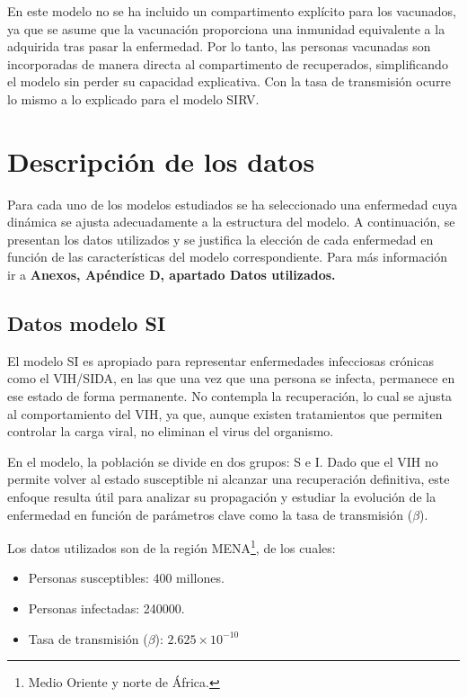 En este modelo no se ha incluido un compartimento explícito para los vacunados, ya que se asume que la vacunación proporciona una inmunidad equivalente a la adquirida tras pasar la enfermedad. Por lo tanto, las personas vacunadas son incorporadas de manera directa al compartimento de recuperados, simplificando el modelo sin perder su capacidad explicativa. Con la tasa de transmisión ocurre lo mismo a lo explicado para el modelo SIRV.




\section{Descripción de los datos}
Para cada uno de los modelos estudiados se ha seleccionado una enfermedad cuya dinámica se ajusta adecuadamente a la estructura del modelo. A continuación, se presentan los datos utilizados y se justifica la elección de cada enfermedad en función de las características del modelo correspondiente. Para más información ir a \textbf{Anexos, Apéndice D, apartado Datos utilizados.}

\subsection{Datos modelo SI}
El modelo SI es apropiado para representar enfermedades infecciosas crónicas como el VIH/SIDA, en las que una vez que una persona se infecta, permanece en ese estado de forma permanente. No contempla la recuperación, lo cual se ajusta al comportamiento del VIH, ya que, aunque existen tratamientos que permiten controlar la carga viral, no eliminan el virus del organismo.

En el modelo, la población se divide en dos grupos: S e I. Dado que el VIH no permite volver al estado susceptible ni alcanzar una recuperación definitiva, este enfoque resulta útil para analizar su propagación y estudiar la evolución de la enfermedad en función de parámetros clave como la tasa de transmisión ($\beta$).

Los datos utilizados son de la región MENA\footnote{Medio Oriente y norte de África.}, de los cuales:
\begin{itemize}
    \item Personas susceptibles: 400 millones.
    \item Personas infectadas: 240000.
    \item Tasa de transmisión ($\beta$): $2.625 \times 10^{-10}$
\end{itemize}

